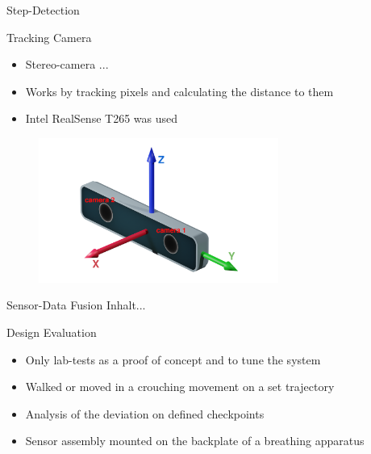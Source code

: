 \documentclass[aspectratio=1609]{beamer}
\begin{document}
{\begin{frame}{Step-Detection}
		
	\end{frame}
	
	\begin{frame}{Tracking Camera}
		\begin{itemize}
			\item Stereo-camera ...
			\item Works by tracking pixels and calculating the distance to them
			\item Intel RealSense T265 was used
		\end{itemize}
		\begin{figure}
			\centering
			\includegraphics[width=0.7\textwidth]{../Conference_Paper/realsense.png}
		\end{figure}
	\end{frame}
	
	\begin{frame}{Sensor-Data Fusion}
		Inhalt...
	\end{frame}
	
	\begin{frame}{Design Evaluation}
		\begin{itemize}
			\item Only lab-tests as a proof of concept and to tune the system
			\item Walked or moved in a crouching movement on a set trajectory
			\item Analysis of the deviation on defined checkpoints
			\item Sensor assembly mounted on the backplate of a breathing apparatus
		\end{itemize}
		
	\end{frame}
	
}
\end{document}
